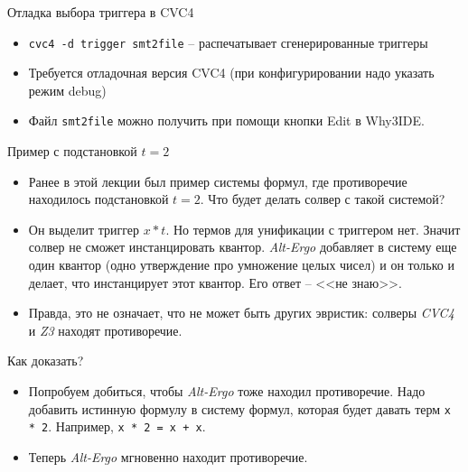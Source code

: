 \documentclass[hyperref={unicode=true}]{beamer}
\begin{document}
    \begin{frame}{Отладка выбора триггера в CVC4}
    \begin{itemize}
    \item
    \texttt{cvc4 -d trigger smt2file} -- распечатывает
    сгенерированные триггеры
    \item
    Требуется отладочная версия CVC4 (при конфигурировании
    надо указать режим debug)
    \item
    Файл \texttt{smt2file} можно получить при помощи кнопки Edit
    в Why3IDE.
    \end{itemize}
    \end{frame}

    \begin{frame}{Пример с подстановкой $t = 2$}
    \begin{itemize}
    \item
    Ранее в этой лекции был пример системы формул, где противоречие
    находилось подстановкой $t = 2$. Что будет делать солвер с такой системой?
    \item
    Он выделит триггер $x * t$. Но термов для унификации с триггером нет.
    Значит солвер не сможет инстанцировать квантор. \textsl{Alt-Ergo}
    добавляет в систему еще один квантор (одно утверждение про умножение
    целых чисел) и он только и делает, что инстанцирует этот квантор. Его
    ответ -- <<не знаю>>.
    \item
    Правда, это не означает, что не может быть других эвристик: солверы
    \textsl{CVC4} и \textsl{Z3} находят противоречие.
    \end{itemize}
    \end{frame}

    \begin{frame}{Как доказать?}
    \begin{itemize}
    \item
    Попробуем добиться, чтобы \textsl{Alt-Ergo} тоже находил противоречие.
    Надо добавить истинную формулу в систему формул, которая будет давать
    терм \texttt{x * 2}. Например, \texttt{x * 2 = x + x}.
    \item
    Теперь \textsl{Alt-Ergo} мгновенно находит противоречие.
    \end{itemize}
    \end{frame}
\end{document}

